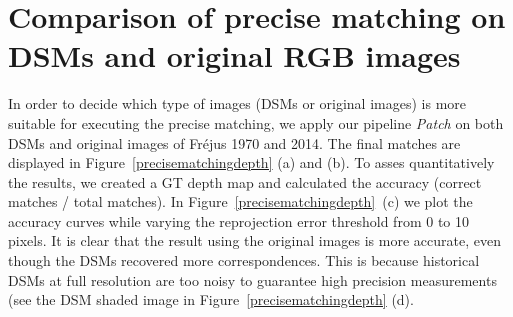 
\chapter{Comparison of precise matching on DSMs and original RGB images}
\label{chap:appendix4}
In order to decide which type of images (DSMs or original images) is more suitable for executing the precise matching, we apply our pipeline \textit{Patch} on both DSMs and original images of Fr{\'e}jus 1970 and 2014.
The final matches are displayed in Figure~\ref{precisematchingdepth} (a) and (b). 
To asses quantitatively the results, we created a GT depth map and calculated the accuracy (correct matches / total matches). In Figure~\ref{precisematchingdepth}~(c) we plot the accuracy curves while varying the reprojection error threshold from 0 to 10 pixels. 
{It is clear that} the result using the original images is more accurate, even though the DSMs recovered more correspondences.
This is because historical DSMs at full resolution are too noisy to guarantee high precision measurements (see the DSM shaded image in Figure~\ref{precisematchingdepth} (d).
\begin{figure*}[htbp]
	\begin{center}
		\caption{Comparison of precise matching on original RGB images and DSMs.}
		\label{precisematchingdepth}
	\end{center}
\end{figure*} 


